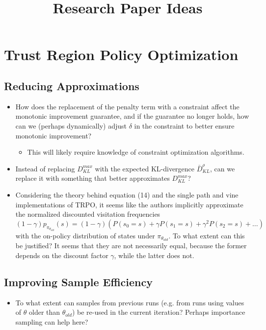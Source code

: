 \documentclass[a4paper]{article}
\title{Research Paper Ideas}
\author{}
\date{}
\begin{document}
\maketitle
\section*{Trust Region Policy Optimization}
\subsection*{Reducing Approximations}
\begin{itemize}
    \item How does the replacement of the penalty term with a constraint affect
        the monotonic improvement guarantee, and if the guarantee no longer
        holds, how can we (perhaps dynamically) adjust $\delta$ in the
        constraint to better ensure monotonic improvement?
    \begin{itemize}
        \item This will likely require knowledge of constraint optimization
            algorithms.
    \end{itemize}
    \item Instead of replacing $D_{KL}^{max}$ with the expected KL-divergence
        $\bar{D}_{KL}^{\rho}$, can we replace it with something that better
        approximates $D_{KL}^{max}$?
    \item Considering the theory behind equation (14) and the single path and
        vine implementations of TRPO, it seems like the authors implicitly
        approximate the normalized discounted visitation frequencies $(1 -
        \gamma)p_{\pi_{\theta_{old}}}(s) = (1 - \gamma)(P(s_0 = s) + \gamma
        P(s_1 = s) + \gamma^{2} P(s_2 = s) + \dots)$ with the on-policy
        distribution of states under $\pi_{\theta_{old}}$. To what extent can
        this be justified? It seems that they are not necessarily equal,
        because the former depends on the discount factor $\gamma$, while the
        latter does not.
\end{itemize}
\subsection*{Improving Sample Efficiency}
\begin{itemize}
    \item To what extent can samples from previous runs (e.g. from runs using
        values of $\theta$ older than $\theta_{old}$) be re-used in the current
        iteration? Perhaps importance sampling can help here?
\end{itemize}
\end{document}
